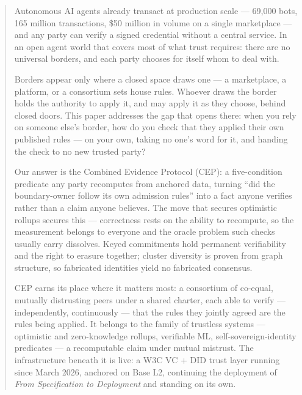 
\begin{abstract}
Autonomous AI agents already transact at production scale — 69{,}000 bots, 165 million transactions, \$50 million in volume on a single marketplace \cite{ref1_agentmarket} — and any party can verify a signed credential without a central service. In an open agent world that covers most of what trust requires: there are no universal borders, and each party chooses for itself whom to deal with.

Borders appear only where a closed space draws one — a marketplace, a platform, or a consortium sets house rules. Whoever draws the border holds the authority to apply it, and may apply it as they choose, behind closed doors. This paper addresses the gap that opens there: when you rely on someone else's border, how do you check that they applied their own published rules — on your own, taking no one's word for it, and handing the check to no new trusted party?

Our answer is the Combined Evidence Protocol (CEP): a five-condition predicate any party recomputes from anchored data, turning ``did the boundary-owner follow its own admission rules'' into a fact anyone verifies rather than a claim anyone believes. The move that secures optimistic rollups secures this — correctness rests on the ability to recompute, so the measurement belongs to everyone and the oracle problem such checks usually carry dissolves. Keyed commitments hold permanent verifiability and the right to erasure together; cluster diversity is proven from graph structure, so fabricated identities yield no fabricated consensus.

CEP earns its place where it matters most: a consortium of co-equal, mutually distrusting peers under a shared charter, each able to verify — independently, continuously — that the rules they jointly agreed are the rules being applied. It belongs to the family of trustless systems — optimistic and zero-knowledge rollups, verifiable ML, self-sovereign-identity predicates — a recomputable claim under mutual mistrust. The infrastructure beneath it is live: a W3C VC + DID trust layer running since March 2026, anchored on Base L2, continuing the deployment of \emph{From Specification to Deployment} \cite{ref57_kroehl_v19} and standing on its own.
\end{abstract}

